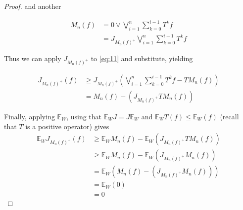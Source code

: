 \documentclass[letterpaper,10pt,oneside,onecolumn,reqno]{amsart}
\newcommand{\E}{\mathbb E}
\theoremstyle{definition}
\newcommand{\join}{\vee}
\begin{document}
\begin{proof}
  and another

  \begin{align}
    \label{eq:13}
    M_n(f) &= 0 \join \bigvee_{i=1}^n\sum\limits_{k=0}^{i-1} T^{k}f \\
    \label{eq:14}
    &= J_{M_n{(f)}^+}\bigvee_{i=1}^n\sum\limits_{k=0}^{i-1} T^{k}f
  \end{align}

  Thus we can apply $J_{M_n{(f)}^+}$ to \eqref{eq:11} and substitute,
  yielding

  \begin{align}
    \label{eq:15}
    J_{M_n{(f)}^+}(f) &\geq J_{M_n{(f)}^+}(\bigvee_{i=1}^{n}\sum\limits_{k=0}^{i-1} T^{k}f - TM_n(f)) \\
    \label{eq:16}
    &= M_n(f)-(J_{M_n{(f)}^+}TM_n(f))
  \end{align}

  Finally, applying $\E_W$, using that $\E_W J=J\E_W$
  and $\E_W T(f) \leq \E_W(f) $ (recall that $T$ is a
  positive operator) gives
  \begin{align*}
    \label{eq:17}
    \E_W J_{M_n{(f)}^+}(f)&\geq \E_W M_n(f)-\E_W(J_{M_n{(f)}^+}TM_n(f)) \\
    &\geq \E_W M_n(f)-\E_W(J_{M_n{(f)}^+}M_n(f)) \\
    &= \E_W(M_n(f)-(J_{M_n{(f)}^+}M_n(f))) \\
    &= \E_W(0) \\
    &= 0
  \end{align*}

\end{proof}

\printindex
\end{document}
